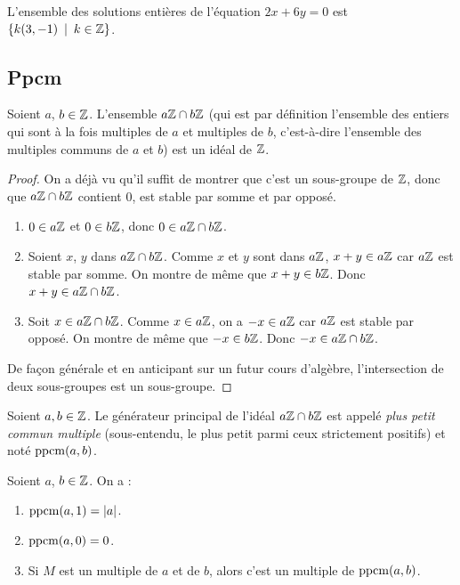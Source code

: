 \begin{exemple}
L'ensemble des solutions entières de l'équation $2x+6y=0$ est $\{k(3,-1)\:\mid\:k\in\mathbb{Z}\}$.
\end{exemple}



\subsection{Ppcm}

\begin{proposition}
Soient $a$, $b \in \mathbb{Z}$. L'ensemble $a\mathbb{Z}\cap b\mathbb{Z}$ (qui est par définition l'ensemble des entiers qui sont à la fois multiples de $a$ et multiples de $b$, c'est-à-dire l'ensemble des multiples communs de $a$ et $b$) est un idéal de $\mathbb{Z}$.
\end{proposition}
\begin{proof}
On a déjà vu qu'il suffit de montrer que c'est un sous-groupe de $\mathbb{Z}$, donc que $a\mathbb{Z}\cap b\mathbb{Z}$ contient $0$, est stable par somme et par opposé. 
\begin{enumerate}
\item $0 \in a\mathbb{Z}$ et $0\in b\mathbb{Z}$, donc $0 \in a\mathbb{Z}\cap b\mathbb{Z}$.
\item Soient $x$, $y$ dans $a\mathbb{Z}\cap b\mathbb{Z}$. Comme $x$ et $y$ sont dans $a\mathbb{Z}$, $x+y\in a\mathbb{Z}$ car $a\mathbb{Z}$ est stable par somme. On montre de même que $x+y\in b\mathbb{Z}$. Donc $x+y \in a\mathbb{Z}\cap b\mathbb{Z}$.
\item Soit $x\in a\mathbb{Z}\cap b\mathbb{Z}$. Comme $x\in a\mathbb{Z}$, on a $-x\in a\mathbb{Z}$ car $a\mathbb{Z}$ est stable par opposé. On montre de même que $-x\in b\mathbb{Z}$. Donc $-x \in a\mathbb{Z}\cap b\mathbb{Z}$.
\end{enumerate}

De façon générale et en anticipant sur un futur cours d'algèbre, l'intersection de deux sous-groupes est un sous-groupe.
\end{proof}

\begin{definition}
Soient $a, b\in \mathbb{Z}$. Le générateur principal de l'idéal $a\mathbb{Z}\cap b\mathbb{Z}$ est appelé \emph{plus petit commun multiple} (sous-entendu, le plus petit parmi ceux strictement positifs) et noté $\operatorname{ppcm}(a,b)$.
\end{definition}

\begin{proposition}
Soient $a$, $b \in \mathbb{Z}$. On a :
\begin{enumerate}
\item $\operatorname{ppcm}(a,1)=|a|$.
\item $\operatorname{ppcm}(a,0)=0$.
\item Si $M$ est un multiple de $a$ et de $b$, alors c'est un multiple de $\operatorname{ppcm}(a,b)$.
\end{enumerate}
\end{proposition}

